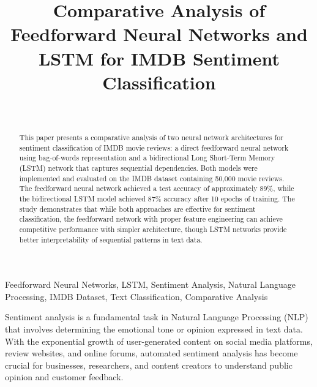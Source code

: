 \documentclass[a4paper, journal]{IEEEtran}
\begin{document}
\title{Comparative Analysis of Feedforward Neural Networks and LSTM for IMDB Sentiment Classification}
\author{
     \\
    }

\maketitle

\begin{abstract}
This paper presents a comparative analysis of two neural network architectures for sentiment classification of IMDB movie reviews: a direct feedforward neural network using bag-of-words representation and a bidirectional Long Short-Term Memory (LSTM) network that captures sequential dependencies. Both models were implemented and evaluated on the IMDB dataset containing 50,000 movie reviews. The feedforward neural network achieved a test accuracy of approximately 89\%, while the bidirectional LSTM model achieved 87\% accuracy after 10 epochs of training. The study demonstrates that while both approaches are effective for sentiment classification, the feedforward network with proper feature engineering can achieve competitive performance with simpler architecture, though LSTM networks provide better interpretability of sequential patterns in text data.
\end{abstract}

\begin{IEEEkeywords}
Feedforward Neural Networks, LSTM, Sentiment Analysis, Natural Language Processing, IMDB Dataset, Text Classification, Comparative Analysis
\end{IEEEkeywords}
Sentiment analysis is a fundamental task in Natural Language Processing (NLP) that involves determining the emotional tone or opinion expressed in text data. With the exponential growth of user-generated content on social media platforms, review websites, and online forums, automated sentiment analysis has become crucial for businesses, researchers, and content creators to understand public opinion and customer feedback.
\end{document}
